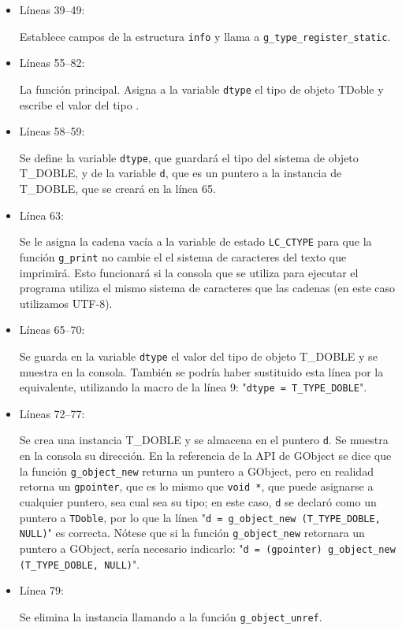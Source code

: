 \begin{itemize}
\item Líneas 39--49:\par
  Establece campos de la estructura \texttt{info} y llama a \texttt{g\_type\_register\_static}.
\item Líneas 55--82:\par
  La función principal. Asigna a la variable \texttt{dtype} el tipo de objeto \textsf{TDoble} y escribe el valor
  del tipo .
\item Líneas 58--59:\par
  Se define la variable \texttt{dtype}, que guardará el tipo del sistema de objeto \textsf{T\_DOBLE}, y de la
  variable \texttt{d}, que es un puntero a la instancia de \textsf{T\_DOBLE}, que se creará en la línea 65.
\item Línea 63:\par
  Se le asigna la cadena vacía a la variable de estado \texttt{LC\_CTYPE} para que la función
  \texttt{g\_print} no cambie el el sistema de caracteres del texto que imprimirá.
  Esto funcionará si la consola que se utiliza para ejecutar el programa utiliza el mismo sistema de caracteres
  que las cadenas (en este caso utilizamos UTF-8).
\item Líneas 65--70:\par
  Se guarda en la variable \texttt{dtype} el valor del tipo de objeto \textsf{T\_DOBLE} y se muestra en la consola.
  También se podría haber sustituido esta línea por la equivalente, utilizando la macro de la línea 9:
  "\texttt{dtype = T\_TYPE\_DOBLE}".
\item Líneas 72--77:\par
  Se crea una instancia \textsf{T\_DOBLE} y se almacena en el puntero \texttt{d}. Se muestra en la consola su
  dirección. En la referencia de la API de \textsf{GObject} se dice que la función
  \texttt{g\_object\_new} returna un puntero a \textsf{GObject}, pero en realidad retorna un
  \texttt{gpointer}, que es lo mismo que \texttt{void *}, que puede asignarse a cualquier puntero, sea cual sea
  su tipo; en este caso, \texttt{d} se declaró como un puntero a \texttt{TDoble}, por lo que la línea
  "\texttt{d = g\_object\_new (T\_TYPE\_DOBLE, NULL)}" es correcta. Nótese que si la función
  \texttt{g\_object\_new} retornara un puntero a \textsf{GObject}, sería necesario indicarlo:
  "\texttt{d = (gpointer) g\_object\_new (T\_TYPE\_DOBLE, NULL)}".
\item Línea 79:\par
  Se elimina la instancia llamando a la función \texttt{g\_object\_unref}.
\end{itemize}

